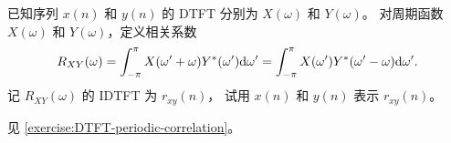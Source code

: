 \begin{homework}
    已知序列 $x(n)$ 和 $y(n)$ 的 DTFT 分别为 $X(\omega)$ 和 $Y(\omega)$。
    对周期函数 $X(\omega)$ 和 $Y(\omega)$，定义相关系数
    \begin{align*}
        R_{XY}(\omega) = \int_{-\pi}^{\pi}X(\omega' + \omega)Y^*(\omega')\mathrm{d}\omega'
            = \int_{-\pi}^{\pi}X(\omega')Y^*(\omega' - \omega)\mathrm{d}\omega'.
    \end{align*}
    记 $R_{XY}(\omega)$ 的 IDTFT 为 $r_{xy}(n)$，
    试用 $x(n)$ 和 $y(n)$ 表示 $r_{xy}(n)$。
\end{homework}

\begin{solution}
    见 \ref{exercise:DTFT-periodic-correlation}。
\end{solution}
